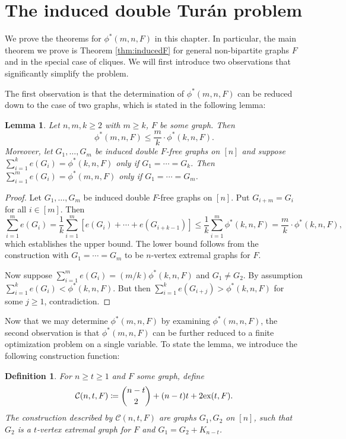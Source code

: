 \documentclass[12pt]{article}
\newtheorem{lemma}[theorem]{Lemma}
\newtheorem{definition}[theorem]{Definition}
\newcommand*{\ex}{\textnormal{ex}}
\newcommand*{\con}{\mathcal{C}}
\begin{document}
\section{The induced double Tur\'{a}n problem}

We prove the theorems for $\phi^*(m, n ,F)$ in this chapter. In particular, the main theorem we prove is Theorem \ref{thm:inducedF} for general non-bipartite graphs $F$ and in the special case of cliques. We will first introduce two observations that significantly simplify the problem.

The first observation is that the determination of $\phi^*(m, n, F)$ can be reduced down to the case of two graphs, which is stated in the following lemma:

\begin{lemma}\label{lem:induce-reduce}
  Let $n, m, k \geq 2$ with $m \geq k$, $F$ be some graph. Then
  \[
    \phi^*(m, n, F) \leq \frac{m}{k} \cdot \phi^*(k, n, F).
  \]
  Moreover, let $G_1, \ldots, G_m$ be induced double $F$-free graphs on $[n]$ and suppose $\sum_{i = 1}^k e(G_i) = \phi^*(k, n, F)$ only if $G_1 = \cdots = G_k$. Then $\sum_{i = 1}^m e(G_i) = \phi^*(m, n, F)$ only if $G_1 = \cdots = G_m$.
\end{lemma}

\begin{proof}
  Let $G_1, \ldots, G_m$ be induced double $F$-free graphs on $[n]$. Put $G_{i + m} = G_i$ for all $i \in [m]$. Then
  \[
    \sum_{i = 1}^m e(G_i) = \frac{1}{k}\sum_{i = 1}^m [e(G_i) + \cdots + e(G_{i + k - 1})] \leq \frac{1}{k}\sum_{i = 1}^m \phi^*(k, n, F) = \frac{m}{k} \cdot \phi^*(k, n, F),
  \]
  which establishes the upper bound. The lower bound follows from the construction with $G_1 = \cdots = G_m$ to be $n$-vertex extremal graphs for $F$.

  Now suppose $\sum_{i = 1}^m e(G_i) = (m/k)\phi^*(k, n, F)$ and $G_1 \neq G_2$. By assumption $\sum_{i = 1}^k e(G_i) < \phi^*(k, n, F)$. But then $\sum_{i = 1}^k e(G_{i + j}) > \phi^*(k, n, F)$ for some $j \geq 1$, contradiction. 
\end{proof}

Now that we may determine $\phi^*(m, n, F)$ by examining $\phi^*(m, n, F)$, the second observation is that $\phi^*(m, n, F)$ can be further reduced to a finite optimization problem on a single variable. To state the lemma, we introduce the following construction function: 

\begin{definition}
  For $n \geq t \geq 1$ and $F$ some graph, define 
  \[
    \con(n, t, F) \coloneq \binom{n - t}{2} + (n - t)t + 2\ex(t, F).
  \]
  The construction described by $\con(n, t, F)$ are graphs $G_1, G_2$ on $[n]$, such that $G_2$ is a $t$-vertex extremal graph for $F$ and $G_1 = G_2 + K_{n - t}$. 
\end{definition}
\end{document}
